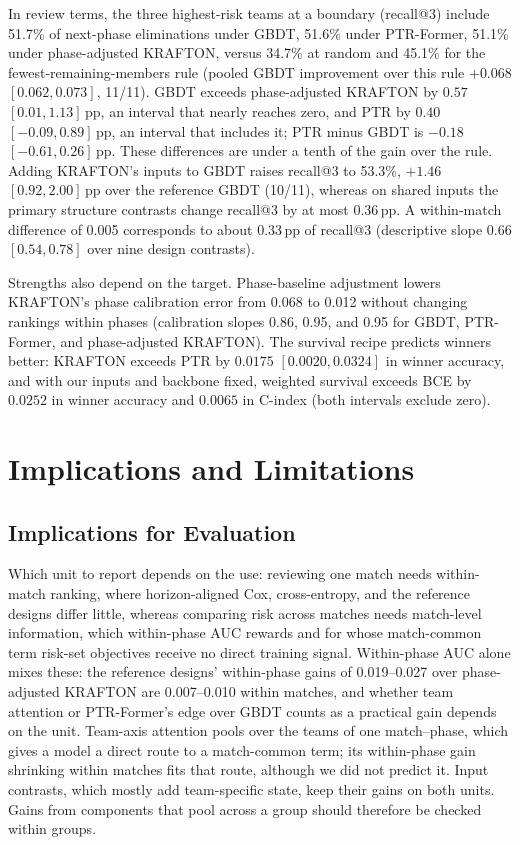 \documentclass[sigconf,anonymous,nonacm]{acmart}
\begin{document}
In review terms, the three highest-risk teams at a boundary (recall@3) include 51.7\% of next-phase eliminations under GBDT, 51.6\% under PTR-Former, 51.1\% under phase-adjusted KRAFTON, versus 34.7\% at random and 45.1\% for the fewest-remaining-members rule (pooled GBDT improvement over this rule $+0.068$ $[0.062,\allowbreak 0.073]$, 11/11). GBDT exceeds phase-adjusted KRAFTON by $0.57$ $[0.01,\allowbreak 1.13]$\,pp, an interval that nearly reaches zero, and PTR by $0.40$ $[-0.09,\allowbreak 0.89]$\,pp, an interval that includes it; PTR minus GBDT is $-0.18$ $[-0.61,\allowbreak 0.26]$\,pp. These differences are under a tenth of the gain over the rule. Adding KRAFTON's inputs to GBDT raises recall@3 to 53.3\%, $+1.46$ $[0.92,\allowbreak 2.00]$\,pp over the reference GBDT (10/11), whereas on shared inputs the primary structure contrasts change recall@3 by at most 0.36\,pp. A within-match difference of 0.005 corresponds to about 0.33\,pp of recall@3 (descriptive slope 0.66 $[0.54,\allowbreak 0.78]$ over nine design contrasts).

Strengths also depend on the target. Phase-baseline adjustment lowers KRAFTON's phase calibration error from 0.068 to 0.012 without changing rankings within phases (calibration slopes 0.86, 0.95, and 0.95 for GBDT, PTR-Former, and phase-adjusted KRAFTON). The survival recipe predicts winners better: KRAFTON exceeds PTR by $0.0175$ $[0.0020,\allowbreak 0.0324]$ in winner accuracy, and with our inputs and backbone fixed, weighted survival exceeds BCE by $0.0252$ in winner accuracy and $0.0065$ in C-index (both intervals exclude zero).


\section{Implications and Limitations}
\label{sec:discussion}
\subsection{Implications for Evaluation}
\label{sec:discussion:implications}
Which unit to report depends on the use: reviewing one match needs within-match ranking, where horizon-aligned Cox, cross-entropy, and the reference designs differ little, whereas comparing risk across matches needs match-level information, which within-phase AUC rewards and for whose match-common term risk-set objectives receive no direct training signal. Within-phase AUC alone mixes these: the reference designs' within-phase gains of 0.019--0.027 over phase-adjusted KRAFTON are 0.007--0.010 within matches, and whether team attention or PTR-Former's edge over GBDT counts as a practical gain depends on the unit. Team-axis attention pools over the teams of one match--phase, which gives a model a direct route to a match-common term; its within-phase gain shrinking within matches fits that route, although we did not predict it. Input contrasts, which mostly add team-specific state, keep their gains on both units. Gains from components that pool across a group should therefore be checked within groups.
\end{document}
